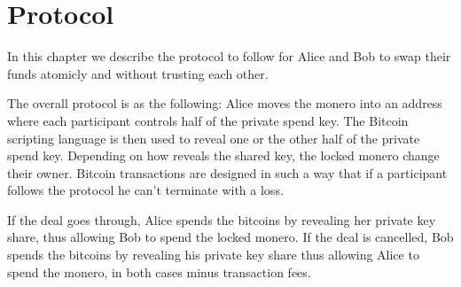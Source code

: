 \documentclass{llncs}
\begin{document}
\section{Protocol}
In this chapter we describe the protocol to follow for Alice and Bob to swap their funds atomicly and without trusting each other.

The overall protocol is as the following: Alice moves the monero into an address where each participant controls half of the private spend key. The Bitcoin scripting language is then used to reveal one or the other half of the private spend key. Depending on how reveals the shared key, the locked monero change their owner. Bitcoin transactions are designed in such a way that if a participant follows the protocol he can't terminate with a loss.

If the deal goes through, Alice spends the bitcoins by revealing her private key share, thus allowing Bob to spend the locked monero. If the deal is cancelled, Bob spends the bitcoins by revealing his private key share thus allowing Alice to spend the monero, in both cases minus transaction fees.
\end{document}
